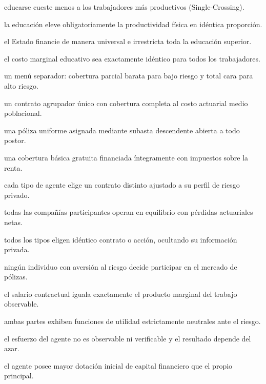 \begin{opts}
    \item educarse cueste menos a los trabajadores más productivos (Single-Crossing).
    \item la educación eleve obligatoriamente la productividad física en idéntica proporción.
    \item el Estado financie de manera universal e irrestricta toda la educación superior.
    \item el costo marginal educativo sea exactamente idéntico para todos los trabajadores.
\end{opts}

\begin{opts}
    \item un menú separador: cobertura parcial barata para bajo riesgo y total cara para alto riesgo.
    \item un contrato agrupador único con cobertura completa al costo actuarial medio poblacional.
    \item una póliza uniforme asignada mediante subasta descendente abierta a todo postor.
    \item una cobertura básica gratuita financiada íntegramente con impuestos sobre la renta.
\end{opts}

\begin{opts}
    \item cada tipo de agente elige un contrato distinto ajustado a su perfil de riesgo privado.
    \item todas las compañías participantes operan en equilibrio con pérdidas actuariales netas.
    \item todos los tipos eligen idéntico contrato o acción, ocultando su información privada.
    \item ningún individuo con aversión al riesgo decide participar en el mercado de pólizas.
\end{opts}

\begin{opts}
    \item el salario contractual iguala exactamente el producto marginal del trabajo observable.
    \item ambas partes exhiben funciones de utilidad estrictamente neutrales ante el riesgo.
    \item el esfuerzo del agente no es observable ni verificable y el resultado depende del azar.
    \item el agente posee mayor dotación inicial de capital financiero que el propio principal.
\end{opts}

